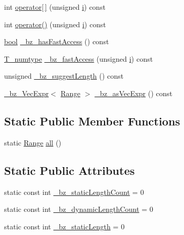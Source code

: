 \begin{DoxyCompactItemize}
int \hyperlink{classRange_a0fe0fdee1e731210f80a0d3bc890767e}{operator\mbox{[}$\,$\mbox{]}} (unsigned \hyperlink{indexexpr_8h_aabd77643995707c185e95c8cb2782c81}{i}) const 
\item 
int \hyperlink{classRange_af46bbe42b487e35e050130721dd9052d}{operator()} (unsigned \hyperlink{indexexpr_8h_aabd77643995707c185e95c8cb2782c81}{i}) const 
\item 
\hyperlink{compiler_8h_abb452686968e48b67397da5f97445f5b}{bool} \hyperlink{classRange_a9e9d6f5a2a8ec76b0794897f91fbe696}{\+\_\+bz\+\_\+has\+Fast\+Access} () const 
\item 
\hyperlink{classRange_a7a87483a88a6bc1ae142f15459a6b630}{T\+\_\+numtype} \hyperlink{classRange_a51ee4a9f73e6e341471ca59373ca3cc2}{\+\_\+bz\+\_\+fast\+Access} (unsigned \hyperlink{indexexpr_8h_aabd77643995707c185e95c8cb2782c81}{i}) const 
\item 
unsigned \hyperlink{classRange_ae9d0b56c921fc280d31bc935718320af}{\+\_\+bz\+\_\+suggest\+Length} () const 
\item 
\hyperlink{class__bz__VecExpr}{\+\_\+bz\+\_\+\+Vec\+Expr}$<$ \hyperlink{classRange}{Range} $>$ \hyperlink{classRange_a85b8db85a148e364b7782f75ca15e6cc}{\+\_\+bz\+\_\+as\+Vec\+Expr} () const 
\end{DoxyCompactItemize}
\subsection*{Static Public Member Functions}
\begin{DoxyCompactItemize}
\item 
static \hyperlink{classRange}{Range} \hyperlink{classRange_aa071ae3c742560c4fff0c5ae44abd4ba}{all} ()
\end{DoxyCompactItemize}
\subsection*{Static Public Attributes}
\begin{DoxyCompactItemize}
\item 
static const int \hyperlink{classRange_a4a4f7cb18880893a26e8e1bc44b1b66b}{\+\_\+bz\+\_\+static\+Length\+Count} = 0
\item 
static const int \hyperlink{classRange_ad0bb30bd4236495d18a0b50fbee6536e}{\+\_\+bz\+\_\+dynamic\+Length\+Count} = 0
\item 
static const int \hyperlink{classRange_a9f2976312ae268a1e43f06099da3381e}{\+\_\+bz\+\_\+static\+Length} = 0
\end{DoxyCompactItemize}

